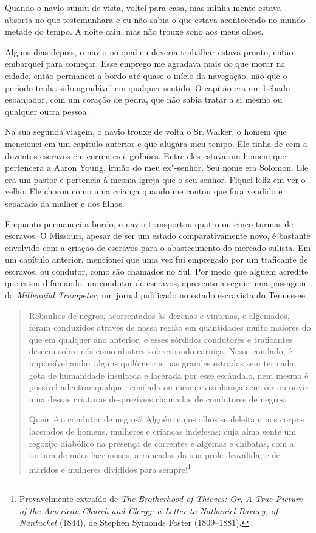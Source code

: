  

Quando o navio sumiu de vista, voltei para casa, mas minha mente estava
absorta no que testemunhara e eu não sabia o que estava acontecendo no
mundo metade do tempo. A noite caiu, mas não trouxe sono aos meus olhos.

Alguns dias depois, o navio no qual eu deveria trabalhar estava pronto,
então embarquei para começar. Esse emprego me agradava mais do que morar
na cidade, então permaneci a bordo até quase o início da navegação; não
que o período tenha sido agradável em qualquer sentido. O capitão era um
bêbado esbanjador, com um coração de pedra, que não sabia tratar a si
mesmo ou qualquer outra pessoa.

Na sua segunda viagem, o navio trouxe de volta o Sr.\,Walker, o homem que
mencionei em um capítulo anterior e que alugara meu tempo. Ele tinha de
cem a duzentos escravos em correntes e grilhões. Entre eles estava um
homem que pertencera a Aaron Young, irmão do meu ex"-senhor. Seu nome era
Solomon. Ele era um pastor e pertencia à mesma igreja que o seu senhor.
Fiquei feliz em ver o velho. Ele chorou como uma criança quando me
contou que fora vendido e separado da mulher e dos filhos.

Enquanto permaneci a bordo, o navio transportou quatro ou cinco turmas
de escravos. O Missouri, apesar de ser um estado comparativamente novo,
é bastante envolvido com a criação de escravos para o abastecimento do
mercado sulista. Em um capítulo anterior, mencionei que uma vez fui
empregado por um traficante de escravos, ou condutor, como são chamados
no Sul. Por medo que alguém acredite que estou difamando um condutor de
escravos, apresento a seguir uma passagem do \emph{Millennial
Trumpeter}, um jornal publicado no estado escravista do Tennessee.

\begin{quote}
Rebanhos de negros, acorrentados às dezenas e vintenas, e algemados,
foram conduzidos através de nossa região em quantidades muito maiores do
que em qualquer ano anterior, e esses sórdidos condutores e traficantes
descem sobre nós como abutres sobrevoando carniça. Nesse condado, é
impossível andar alguns quilômetros nas grandes estradas sem ter cada
gota de humanidade insultada e lacerada por esse escândalo, nem mesmo é
possível adentrar qualquer condado ou mesmo vizinhança sem ver ou ouvir
uma dessas criaturas desprezíveis chamadas de condutores de negros.

Quem é o condutor de negros? Alguém cujos olhos se deleitam nos corpos
lacerados de homens, mulheres e crianças indefesas; cuja alma sente um
regozijo diabólico na presença de correntes e algemas e chibatas, com a
tortura de mães lacrimosas, arrancadas da sua prole desvalida, e de
maridos e mulheres divididos para sempre!\footnote{Provavelmente
  extraído de \emph{The Brotherhood of Thieves: Or, A True Picture of
  the American Church and Clergy: a Letter to Nathaniel Barney, of
  Nantucket} (1844), de Stephen Symonds Foster (1809--1881).}
\end{quote}

